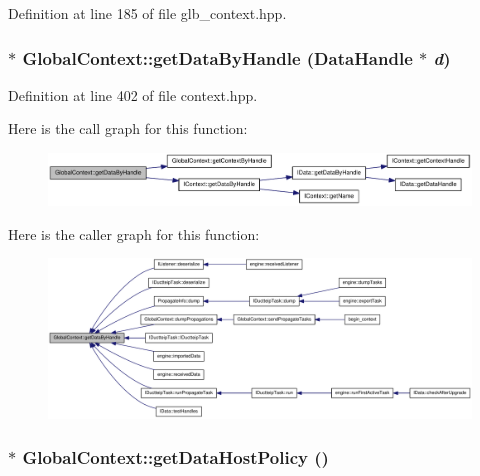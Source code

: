 Definition at line 185 of file glb\_\-context.hpp.\hypertarget{class_global_context_a82ec626cc456bb864bf2376e2bda621f}{
\subsubsection[{getDataByHandle}]{ $\ast$ GlobalContext::getDataByHandle ({\bf DataHandle} $\ast$ {\em d})}}
\label{class_global_context_a82ec626cc456bb864bf2376e2bda621f}


Definition at line 402 of file context.hpp.

Here is the call graph for this function:\nopagebreak
\begin{figure}[H]
\begin{center}
\leavevmode
\includegraphics[width=377pt]{class_global_context_a82ec626cc456bb864bf2376e2bda621f_cgraph}
\end{center}
\end{figure}


Here is the caller graph for this function:\nopagebreak
\begin{figure}[H]
\begin{center}
\leavevmode
\includegraphics[width=420pt]{class_global_context_a82ec626cc456bb864bf2376e2bda621f_icgraph}
\end{center}
\end{figure}
\hypertarget{class_global_context_a8770ae3435a92b44cdc1286e1668c9c8}{
\subsubsection[{getDataHostPolicy}]{$\ast$ GlobalContext::getDataHostPolicy ()}}
\label{class_global_context_a8770ae3435a92b44cdc1286e1668c9c8}


